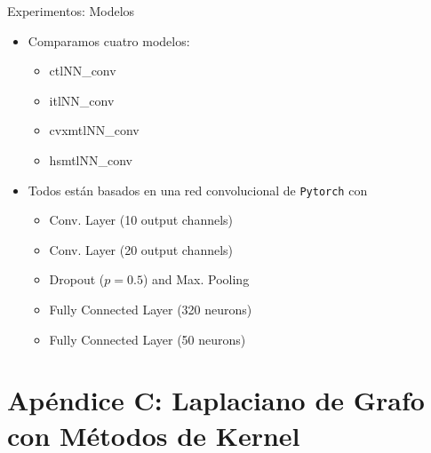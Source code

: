 \documentclass[aspectratio=43,spanish]{beamer}
\newcommand{\fmod}[1]{\textsf{#1}}
\begin{document}
\begin{frame}{Experimentos: Modelos}

      \begin{itemize}
          \item Comparamos cuatro modelos:
          \begin{itemize}
              \item \fmod{ctlNN\_conv}
              \item \fmod{itlNN\_conv}
              \item \fmod{cvxmtlNN\_conv}
              \item \fmod{hsmtlNN\_conv}
          \end{itemize}
          \item Todos están basados en una red convolucional de \texttt{Pytorch} con
          \begin{itemize}
              \item Conv. Layer (10 output channels)
              \item Conv. Layer (20 output channels)
              \item Dropout ($p=0.5$) and Max. Pooling
              \item Fully Connected Layer (320 neurons)
              \item Fully Connected Layer (50 neurons)
          \end{itemize}
      \end{itemize}
  
  \end{frame}



\section{Apéndice C: Laplaciano de Grafo con Métodos de Kernel}
\end{document}
